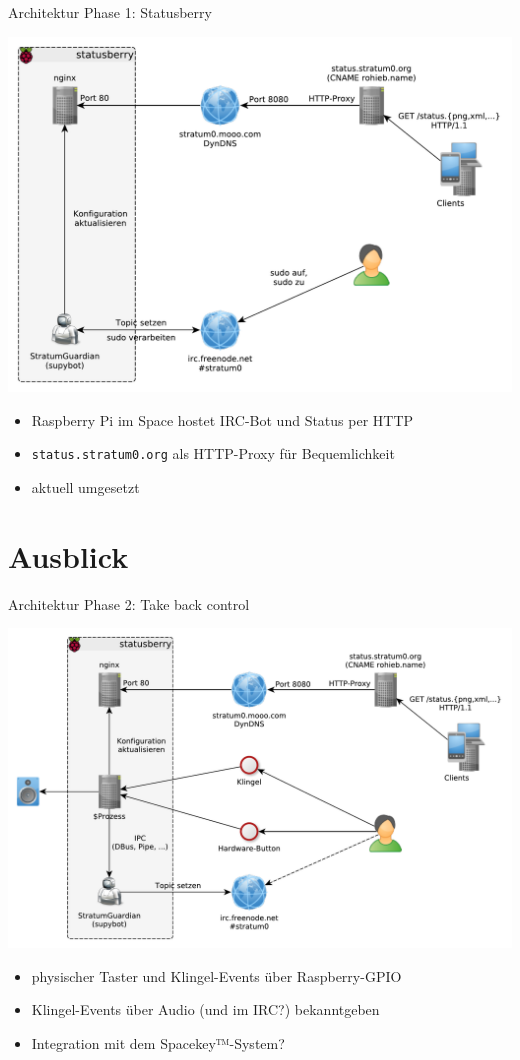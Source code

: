 \documentclass[handout]{beamer}
\begin{document}
\begin{frame}{Architektur Phase 1: Statusberry}
  \begin{center}
    \includegraphics[width=.7\textwidth]{infrastructure-current-phase1.pdf}
  \end{center}

	\begin{itemize}
	  \item Raspberry Pi im Space hostet IRC-Bot und Status per HTTP
		\item \texttt{status.stratum0.org} als HTTP-Proxy für Bequemlichkeit
	  \item aktuell umgesetzt
	\end{itemize}
\end{frame}

\section{Ausblick}
\begin{frame}{Architektur Phase 2: Take back control}
  \begin{center}
    \includegraphics[width=.7\textwidth]{infrastructure-future.pdf}
  \end{center}

	\begin{itemize}
	  \item physischer Taster und Klingel-Events über Raspberry-GPIO
		\item Klingel-Events über Audio (und im IRC?) bekanntgeben
	  \item Integration mit dem Spacekey™-System?
	\end{itemize}
\end{frame}
\end{document}
